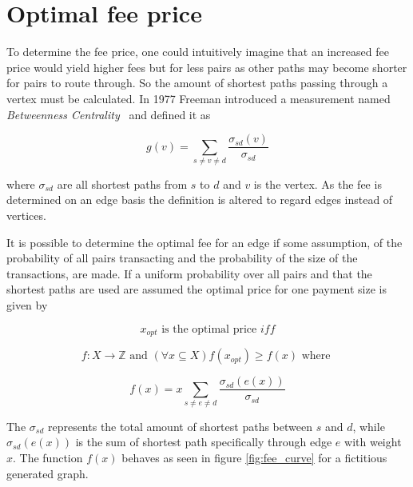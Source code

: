 \section{Optimal fee price}

To determine the fee price, one could intuitively imagine that an increased fee price would yield higher fees but for less pairs as other \gls{path}s may become shorter for pairs to route through. So the amount of shortest paths passing through a vertex must be calculated. In 1977 Freeman introduced a measurement named \textit{Betweenness Centrality}~\cite{freeman:betweenness:centrality} and defined it as

\[ g(v) = \sum_{s \neq v \neq d}\frac{\sigma_{sd}(v)}{\sigma_{sd}} \]

where $\sigma_{sd}$ are all shortest paths from $s$ to $d$ and $v$ is the vertex. As the fee is determined on an edge basis the definition is altered to regard edges instead of vertices. 

It is possible to determine the optimal fee for an edge if some assumption, of the probability of all pairs transacting and the probability of the size of the transactions, are made. If a uniform probability over all pairs and that the shortest \gls{path}s are used are assumed the optimal price for one payment size is given by

\[ x_{opt} \textrm{ is the optimal price } iff \]

\[ f: X \to \mathbb{Z} \textrm{ and } (\forall x \subseteq X)f(x_{opt}) \geqslant f(x) \textrm{ where }\]

\[ f(x) = x\sum_{s \neq e \neq d}\frac{\sigma_{sd}(e(x))}{\sigma_{sd}} \]





The $\sigma_{sd}$ represents the total amount of shortest paths between $s$ and $d$, while $\sigma_{sd}(e(x))$ is the sum of shortest path specifically through edge $e$ with weight $x$.
The function $f(x)$ behaves as seen in figure \ref{fig:fee_curve} for a fictitious generated graph. 

